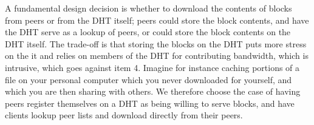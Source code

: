 A fundamental design decision is whether to download the contents of blocks from peers or from the DHT itself; peers could store the block contents, 
and have the DHT serve as a lookup of peers, or could store the block contents on the DHT itself.  The trade-off is that storing the blocks on the DHT puts more stress on the 
it and relies on members of the DHT for contributing bandwidth, which is intrusive, which goes against item 4.  
Imagine for instance caching portions of a file on your personal computer which you never downloaded for yourself, and which you are then sharing with others.  
We therefore choose the case of having peers register themselves on a DHT as being willing to serve blocks, and have clients lookup peer lists and download directly from their peers.
